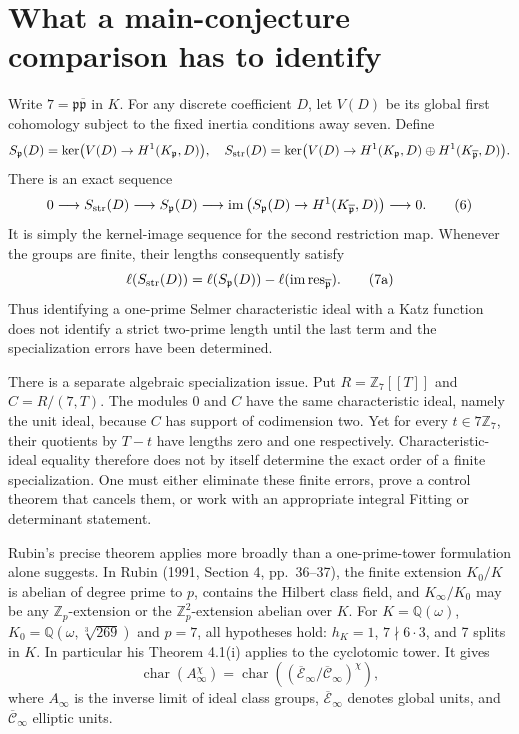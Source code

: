 \documentclass[11pt]{article}
\newcommand{\Z}{\mathbb Z}\newcommand{\Q}{\mathbb Q}
\begin{document}
\section{What a main-conjecture comparison has to identify}
Write $7=\mathfrak p\overline{\mathfrak p}$ in $K$.
For any discrete coefficient $D$, let $V(D)$ be its global first cohomology subject to the fixed inertia conditions away seven. Define
\[
 S_{\mathfrak p}(D)=\ker\bigl(V(D)\to H^1(K_{\mathfrak p},D)\bigr),
 \quad
 S_{\rm str}(D)=\ker\bigl(V(D)\to H^1(K_{\mathfrak p},D)\oplus
 H^1(K_{\overline{\mathfrak p}},D)\bigr).
\]
There is an exact sequence
\[
 0\longrightarrow S_{\rm str}(D)\longrightarrow S_{\mathfrak p}(D)
 \longrightarrow\operatorname{im}\left(S_{\mathfrak p}(D)
 \to H^1(K_{\overline{\mathfrak p}},D)\right)\longrightarrow0.
 \tag{6}
\]
It is simply the kernel-image sequence for the second restriction map.
Whenever the groups are finite, their lengths consequently satisfy
\[
 \ell(S_{\rm str}(D))=\ell(S_{\mathfrak p}(D))-\ell(\operatorname{im}\operatorname{res}_{\overline{\mathfrak p}}).
 \tag{7a}
\]
Thus identifying a one-prime Selmer characteristic ideal with a Katz function does not identify a strict two-prime length until the last term and the specialization errors have been determined.

There is a separate algebraic specialization issue. Put $R=\Z_7[[T]]$ and $C=R/(7,T)$. The modules $0$ and $C$ have the same characteristic ideal, namely the unit ideal, because $C$ has support of codimension two. Yet for every $t\in7\Z_7$, their quotients by $T-t$ have lengths zero and one respectively. Characteristic-ideal equality therefore does not by itself determine the exact order of a finite specialization. One must either eliminate these finite errors, prove a control theorem that cancels them, or work with an appropriate integral Fitting or determinant statement.

Rubin's precise theorem applies more broadly than a one-prime-tower formulation alone suggests. In Rubin (1991, Section 4, pp.~36--37), the finite extension $K_0/K$ is abelian of degree prime to $p$, contains the Hilbert class field, and $K_\infty/K_0$ may be any $\Z_p$-extension or the $\Z_p^2$-extension abelian over $K$. For $K=\Q(\omega)$, $K_0=\Q(\omega,\sqrt[3]{269})$ and $p=7$, all hypotheses hold: $h_K=1$, $7\nmid6\cdot3$, and 7 splits in $K$. In particular his Theorem 4.1(i) applies to the cyclotomic tower. It gives
\[
 \operatorname{char}(A_\infty^\chi)
 =\operatorname{char}((\overline{\mathcal E}_\infty/
                         \overline{\mathcal C}_\infty)^\chi),
\]
where $A_\infty$ is the inverse limit of ideal class groups, $\overline{\mathcal E}_\infty$ denotes global units, and $\overline{\mathcal C}_\infty$ elliptic units.
\end{document}
